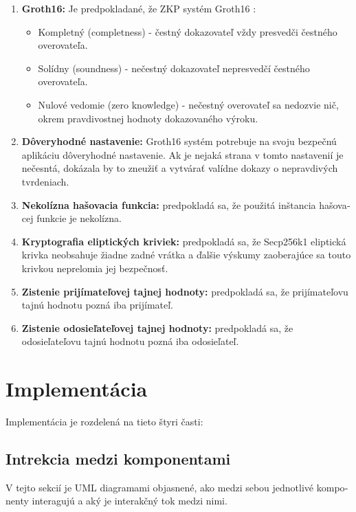 \begin{otherlanguage}{slovak}
\begin{enumerate}
    \item \textbf{Groth16:} Je predpokladané, že ZKP systém Groth16 \cite{Groth16}:
        \begin{itemize}
            \item Kompletný (completness) - čestný dokazovateľ vždy presvedči čestného overovateľa.
            \item Solídny (soundness) - nečestný dokazovateľ nepresvedčí čestného overovateľa.
            \item Nulové vedomie (zero knowledge) - nečestný overovateľ sa nedozvie nič, okrem
                pravdivostnej hodnoty dokazovaného výroku.
        \end{itemize}
    \item \textbf{Dôveryhodné nastavenie:} Groth16 systém potrebuje na svoju bezpečnú
        aplikáciu dôveryhodné nastavenie. Ak je nejaká strana v tomto nastavenií
        je nečesntá, dokázala by to zneužiť a vytvárať valídne dokazy o nepravdivých
        tvrdeniach.
    \item \textbf{Nekolízna hašovacia funkcia:} predpokladá sa, že použitá inštancia
        hašovacej funkcie je nekolízna.
    \item \textbf{Kryptografia eliptických kriviek: } predpokladá sa, že Secp256k1
        eliptická krivka neobsahuje žiadne zadné vrátka a ďalšie výskumy zaoberajúce
        sa touto krivkou neprelomia jej bezpečnosť.
    \item \textbf{Zistenie prijímateľovej tajnej hodnoty: } predpokladá sa, že prijímateľovu
        tajnú hodnotu pozná iba prijímateľ.
    \item \textbf{Zistenie odosieľateľovej tajnej hodnoty: } predpokladá sa, že odosieľateľovu
        tajnú hodnotu pozná iba odosieľateľ.
\end{enumerate}

\section{Implementácia}

Implementácia je rozdelená na tieto štyri časti:

\subsection{Intrekcia medzi komponentami}

V tejto sekcií je UML diagramami objasnené, ako medzi sebou jednotlivé komponenty
interagujú a aký je interakčný tok medzi nimi.


\end{otherlanguage}
